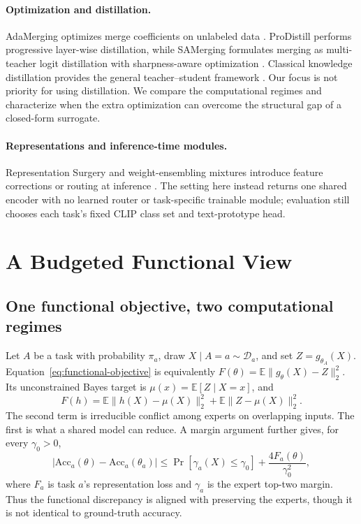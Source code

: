 \documentclass[letterpaper]{article} %
\theoremstyle{plain}
\theoremstyle{definition}
\begin{document}
\paragraph{Optimization and distillation.}
AdaMerging optimizes merge coefficients on unlabeled data \citep{yang2024adamerging}.
ProDistill performs progressive layer-wise distillation, while SAMerging formulates merging as multi-teacher logit distillation with sharpness-aware optimization \citep{prodistill2025,samerging2025}.
Classical knowledge distillation provides the general teacher--student framework \citep{hinton2015distilling}.
Our focus is not priority for using distillation.
We compare the computational regimes and characterize when the extra optimization can overcome the structural gap of a closed-form surrogate.

\paragraph{Representations and inference-time modules.}
Representation Surgery and weight-ensembling mixtures introduce feature corrections or routing at inference \citep{yang2024surgery,tang2024wemoe}.
The setting here instead returns one shared encoder with no learned router or task-specific trainable module; evaluation still chooses each task's fixed CLIP class set and text-prototype head.

\section{A Budgeted Functional View}
\label{sec:theory}

\subsection{One functional objective, two computational regimes}
\label{sec:common-objective}

Let $A$ be a task with probability $\pi_a$, draw $X\mid A=a\sim\mathcal D_a$, and set $Z=g_{\theta_A}(X)$.
Equation~\eqref{eq:functional-objective} is equivalently $F(\theta)=\mathbb E\|g_\theta(X)-Z\|_2^2$.
Its unconstrained Bayes target is $\mu(x)=\mathbb E[Z\mid X=x]$, and
\begin{equation}
F(h)=\mathbb E\|h(X)-\mu(X)\|_2^2
+\mathbb E\|Z-\mu(X)\|_2^2.
\label{eq:bayes-main}
\end{equation}
The second term is irreducible conflict among experts on overlapping inputs.
The first is what a shared model can reduce.
A margin argument further gives, for every $\gamma_0>0$,
\begin{equation}
|\mathrm{Acc}_a(\theta)-\mathrm{Acc}_a(\theta_a)|
\le
\Pr[\gamma_a(X)\le\gamma_0]
+\frac{4F_a(\theta)}{\gamma_0^2},
\label{eq:accuracy-main}
\end{equation}
where $F_a$ is task $a$'s representation loss and $\gamma_a$ is the expert top-two margin.
Thus the functional discrepancy is aligned with preserving the experts, though it is not identical to ground-truth accuracy.
\end{document}
